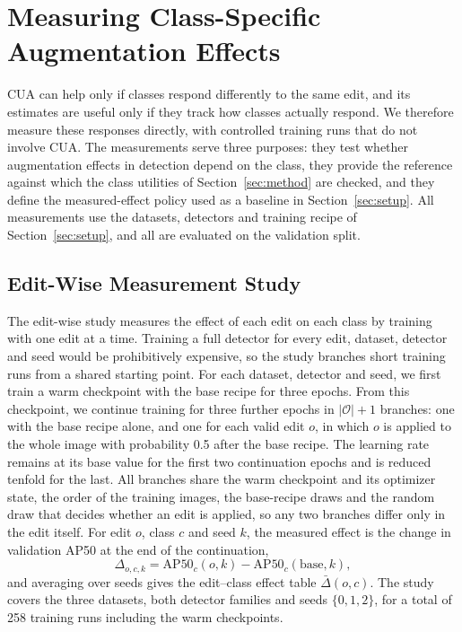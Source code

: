 \documentclass[conference]{IEEEtran}
\begin{document}
\section{Measuring Class-Specific Augmentation Effects}
\label{sec:measurement}

CUA can help only if classes respond differently to the same edit, and its estimates are useful only if they track how classes actually respond. We therefore measure these responses directly, with controlled training runs that do not involve CUA. The measurements serve three purposes: they test whether augmentation effects in detection depend on the class, they provide the reference against which the class utilities of Section~\ref{sec:method} are checked, and they define the measured-effect policy used as a baseline in Section~\ref{sec:setup}. All measurements use the datasets, detectors and training recipe of Section~\ref{sec:setup}, and all are evaluated on the validation split.

\subsection{Edit-Wise Measurement Study}
\label{sec:measure_editwise}

The edit-wise study measures the effect of each edit on each class by training with one edit at a time. Training a full detector for every edit, dataset, detector and seed would be prohibitively expensive, so the study branches short training runs from a shared starting point. For each dataset, detector and seed, we first train a warm checkpoint with the base recipe for three epochs. From this checkpoint, we continue training for three further epochs in $|\mathcal{O}|+1$ branches: one with the base recipe alone, and one for each valid edit $o$, in which $o$ is applied to the whole image with probability 0.5 after the base recipe. The learning rate remains at its base value for the first two continuation epochs and is reduced tenfold for the last. All branches share the warm checkpoint and its optimizer state, the order of the training images, the base-recipe draws and the random draw that decides whether an edit is applied, so any two branches differ only in the edit itself. For edit $o$, class $c$ and seed $k$, the measured effect is the change in validation AP50 at the end of the continuation,
\begin{equation}
\Delta_{o,c,k}=\mathrm{AP50}_c(o,k)-\mathrm{AP50}_c(\mathrm{base},k),
\label{eq:delta}
\end{equation}
and averaging over seeds gives the edit--class effect table $\bar\Delta(o,c)$. The study covers the three datasets, both detector families and seeds $\{0,1,2\}$, for a total of 258 training runs including the warm checkpoints.
\end{document}
